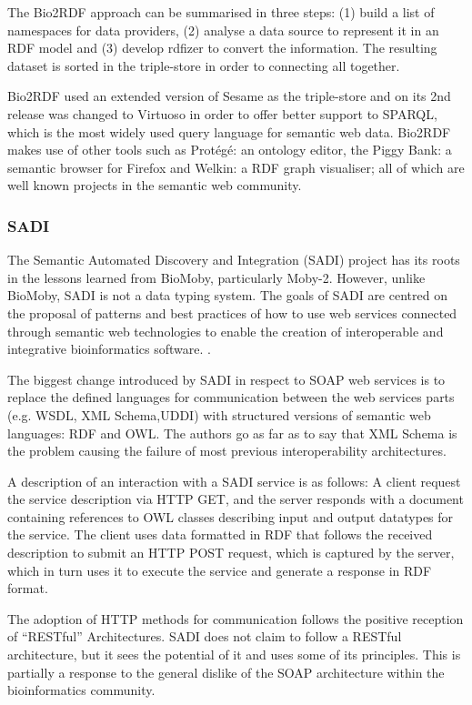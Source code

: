 The Bio2RDF approach can be summarised in three steps: (1) build a list of namespaces for data providers, (2) analyse a data source to represent it in an RDF model and (3) develop rdfizer to convert the information. The resulting dataset is sorted in the triple-store in order to connecting all together.

Bio2RDF used an extended version of Sesame as the triple-store and on its 2nd release was changed to Virtuoso in order to offer better support to SPARQL, which is the most widely used query language for semantic web data. Bio2RDF makes use of other tools such as Protégé: an ontology editor, the Piggy Bank: a semantic browser for Firefox and Welkin: a RDF graph visualiser; all of which are well known projects in the semantic web community.

\subsubsection{SADI}
The Semantic Automated Discovery and Integration (SADI) project has its roots in the lessons learned from BioMoby, particularly  Moby-2. However, unlike BioMoby, SADI is not a data typing system. The goals of SADI are centred on the proposal of patterns and best practices of how to use web services connected through semantic web technologies to enable the creation of interoperable and integrative bioinformatics software. \cite{WIL2011}.

The biggest change introduced by SADI in respect to SOAP web services is to replace the defined languages for communication between the web services parts (e.g. WSDL, XML Schema,UDDI) with structured versions of semantic web languages: RDF and OWL. The authors go as far as to say that XML Schema is the problem causing the failure of most previous interoperability architectures.

A description of an interaction with a SADI service is as follows: A client request the service description via HTTP GET, and the server responds with a document containing references to OWL classes describing input and output datatypes for the service. The client uses data formatted in RDF that follows the received description to submit an HTTP POST request, which is captured by the server, which in turn uses it to execute the service and generate a response in RDF format.

The adoption of HTTP methods for communication follows the positive reception of ``RESTful'' Architectures. SADI does not claim to follow a RESTful architecture, but it sees the potential of it and uses some of its principles. This is partially a response to the general dislike of the SOAP architecture within the bioinformatics community.

